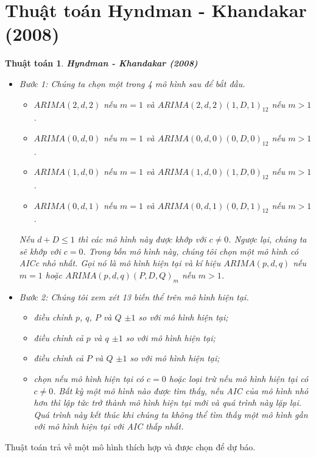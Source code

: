 \documentclass[12pt, a4paper,oneside]{book}
\newtheorem{algo}[theo]{\bf Thuật toán}
\theoremstyle{definition}
\begin{document}
\section{Thuật toán Hyndman - Khandakar (2008)}
\begin{algo}\cite{3}\label{H} \textbf{Hyndman - Khandakar (2008)}\\
	\begin{itemize}
		\item Bước 1: Chúng ta chọn một trong 4 mô hình sau để bắt đầu.
		\begin{itemize}
			\item $ARIMA(2,d,2)$ nếu $m=1$ và $ARIMA(2,d,2)(1,D,1)_{12}$ nếu $m >1$.
			\item $ARIMA(0,d,0)$ nếu $m = 1$ và $ARIMA(0,d,0)(0,D,0)_{12}$ nếu $m >1$.
			\item $ARIMA(1,d,0)$ nếu $m = 1$ và $ARIMA(1,d,0)(1,D,0)_{12}$ nếu $m >1$.
			\item $ARIMA(0,d,1)$ nếu $m = 1$ và $ARIMA(0,d,1)(0,D,1)_{12}$ nếu $m >1$.
		\end{itemize}
		Nếu $d+D\leq1$ thì các mô hình này được khớp với $c\neq0$. Ngược lại, chúng ta sẽ khớp với $c=0$. Trong bốn mô hình này, chúng tôi chọn một mô hình có AICc nhỏ nhất. Gọi nó là mô hình hiện tại và kí hiệu $ARIMA(p,d,q)$ nếu $m=1$ hoặc $ARIMA(p,d,q)(P,D,Q)_m$ nếu $m>1$.\\
		\item Bước 2: Chúng tôi xem xét 13 biến thể trên mô hình hiện tại.
		\begin{itemize}
			\item điều chỉnh $p$, $q$, $P$ và $Q$ $\pm1$ so với mô hình hiện tại;
			\item điều chỉnh cả $p$ và $q$ $\pm1$ so với mô hình hiện tại;
			\item điều chỉnh cả $P$ và $Q$ $\pm1$ so với mô hình hiện tại;
			\item chọn nếu mô hình hiện tại có $c = 0$ hoặc loại trừ nếu mô hình hiện tại có $c\neq0$.
			Bất kỳ một mô hình nào được tìm thấy, nếu AIC của mô hình nhỏ hơn thì lập tức trở thành mô hình hiện tại mới và quá trình này lặp lại. Quá trình này kết thúc khi chúng ta không thể tìm thấy một mô hình gần với mô hình hiện tại với AIC thấp nhất. 
		\end{itemize}
	\end{itemize}
\end{algo}
Thuật toán trả về một mô hình thích hợp và được chọn để dự báo.
\end{document}
